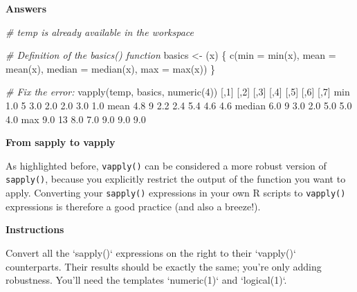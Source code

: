 \documentclass[]{article}
\newcommand{\hlnum}[1]{\textcolor[rgb]{0.816,0.125,0.439}{#1}}%
\newcommand{\hlstr}[1]{\textcolor[rgb]{0.251,0.627,0.251}{#1}}%
\newcommand{\hlcom}[1]{\textcolor[rgb]{0.502,0.502,0.502}{\textit{#1}}}%
\newcommand{\hlstd}[1]{\textcolor[rgb]{0.251,0.251,0.251}{#1}}%
\newcommand{\hlkwc}[1]{\textcolor[rgb]{0.251,0.251,0.251}{#1}}%
\newcommand{\hlkwd}[1]{\textcolor[rgb]{0.878,0.439,0.125}{#1}}%
\newenvironment{Shaded}{\begin{myshaded}}{\end{myshaded}}
\newcommand{\KeywordTok}[1]{\hlkwd{#1}}
\newcommand{\DataTypeTok}[1]{\hlkwc{#1}}
\newcommand{\DecValTok}[1]{\hlnum{#1}}
\newcommand{\FloatTok}[1]{\hlnum{#1}}
\newcommand{\StringTok}[1]{\hlstr{#1}}
\newcommand{\CommentTok}[1]{\hlcom{#1}}
\newcommand{\NormalTok}[1]{\hlstd{#1}}
\begin{document}
\textbf{Answers}

\begin{Shaded}
\begin{Highlighting}[]
\CommentTok{# temp is already available in the workspace}

\CommentTok{# Definition of the basics() function}
\NormalTok{basics <-}\StringTok{ }\NormalTok{(x) \{}
  \KeywordTok{c}\NormalTok{(}\DataTypeTok{min =} \KeywordTok{min}\NormalTok{(x), }\DataTypeTok{mean =} \KeywordTok{mean}\NormalTok{(x), }\DataTypeTok{median =} \KeywordTok{median}\NormalTok{(x), }\DataTypeTok{max =} \KeywordTok{max}\NormalTok{(x))}
\NormalTok{\}}

\CommentTok{# Fix the error:}
\KeywordTok{vapply}\NormalTok{(temp, basics, }\KeywordTok{numeric}\NormalTok{(}\DecValTok{4}\NormalTok{))}
\NormalTok{          [,}\DecValTok{1}\NormalTok{] [,}\DecValTok{2}\NormalTok{] [,}\DecValTok{3}\NormalTok{] [,}\DecValTok{4}\NormalTok{] [,}\DecValTok{5}\NormalTok{] [,}\DecValTok{6}\NormalTok{] [,}\DecValTok{7}\NormalTok{]}
\NormalTok{   min    }\OperatorTok{-}\FloatTok{1.0}    \DecValTok{5} \OperatorTok{-}\FloatTok{3.0} \OperatorTok{-}\FloatTok{2.0}  \FloatTok{2.0} \OperatorTok{-}\FloatTok{3.0}  \FloatTok{1.0}
\NormalTok{   mean    }\FloatTok{4.8}    \DecValTok{9}  \FloatTok{2.2}  \FloatTok{2.4}  \FloatTok{5.4}  \FloatTok{4.6}  \FloatTok{4.6}
\NormalTok{   median  }\FloatTok{6.0}    \DecValTok{9}  \FloatTok{3.0}  \FloatTok{2.0}  \FloatTok{5.0}  \FloatTok{5.0}  \FloatTok{4.0}
\NormalTok{   max     }\FloatTok{9.0}   \DecValTok{13}  \FloatTok{8.0}  \FloatTok{7.0}  \FloatTok{9.0}  \FloatTok{9.0}  \FloatTok{9.0}
\end{Highlighting}
\end{Shaded}

\textbf{From sapply to vapply}

As highlighted before, \texttt{vapply()} can be considered a more robust
version of \texttt{sapply()}, because you explicitly restrict the output
of the function you want to apply. Converting your \texttt{sapply()}
expressions in your own R scripts to \texttt{vapply()} expressions is
therefore a good practice (and also a breeze!).

\textbf{Instructions}

\begin{Shaded}
\begin{Highlighting}[]
\NormalTok{Convert all the }\StringTok{`}\DataTypeTok{sapply()}\StringTok{`}\NormalTok{ expressions on the right to their }\StringTok{`}\DataTypeTok{vapply()}\StringTok{`}\NormalTok{ counterparts. Their results should be exactly the same; you}\StringTok{'re only adding robustness. You'}\NormalTok{ll need the templates }\StringTok{`}\DataTypeTok{numeric(1)}\StringTok{`}\NormalTok{ and }\StringTok{`}\DataTypeTok{logical(1)}\StringTok{`}\NormalTok{.}
\end{Highlighting}
\end{Shaded}
\end{document}
